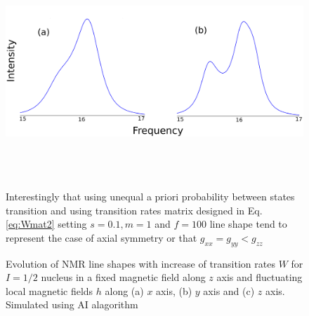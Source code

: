 \begin{figure}[h!]
\centering
\includegraphics[height=8cm,width=1\textwidth]{figures/chap2/gtenanisat2.png}
\caption{Evolution of NMR line shapes with increase of transition rates $W$ for $I=1/2$ nucleus in a fixed magnetic field along $z$ axis and fluctuating local magnetic fields $h$ along (a) $x$ axis, (b) $y$ axis and (c) $z$ axis. Simulated using AI alagorithm}
Interestingly that using unequal a priori probability between states transition and using transition rates matrix designed in Eq.\ref{eq:Wmat2} setting $s=0.1,m=1$ and $f=100$ line shape tend to represent the case of axial symmetry or that $g_{xx}=g_{yy}<g_{zz}$ 
\label{figure:gterates}
\end{figure}
\clearpage
